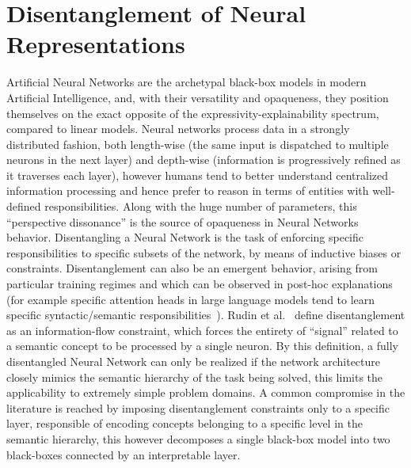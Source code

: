 \section{Disentanglement of Neural Representations}
\label{sec:dnn}
Artificial Neural Networks are the archetypal black-box models in modern Artificial Intelligence, and, with their versatility and opaqueness, they position themselves on the exact opposite of the expressivity-explainability spectrum, compared to linear models.
%
Neural networks process data in a strongly distributed fashion, both length-wise (the same input is dispatched to multiple neurons in the next layer) and depth-wise (information is progressively refined as it traverses each layer), however humans tend to better understand centralized information processing and hence prefer to reason in terms of entities with well-defined responsibilities. Along with the huge number of parameters, this ``perspective dissonance'' is the source of opaqueness in Neural Networks behavior. 
Disentangling a Neural Network is the task of enforcing specific responsibilities to specific subsets of the network, by means of inductive biases or constraints. Disentanglement can also be an emergent behavior, arising from particular training regimes and which can be observed in post-hoc explanations (for example specific attention heads in large language models tend to learn specific syntactic/semantic responsibilities~\cite{rogers2020primer}).
%
Rudin et al.~\cite{rudin2022interpretable} define disentanglement as an information-flow constraint, which forces the entirety of ``signal'' related to a semantic concept to be processed by a single neuron. By this definition, a fully disentangled Neural Network can only be realized if the network architecture closely mimics the semantic hierarchy of the task being solved, this limits the applicability to extremely simple problem domains. A common compromise in the literature is reached by imposing disentanglement constraints only to a specific layer, responsible of encoding concepts belonging to a specific level in the semantic hierarchy, this however decomposes a single black-box model into two black-boxes connected by an interpretable layer. 

